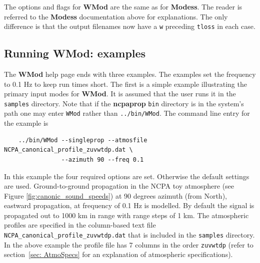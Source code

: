 The options and flags for {\bf WMod} are the same as for {\bf Modess}. The reader is referred to the {\bf Modess} documentation above for explanations. The only difference is that the output filenames now have a \verb+w+ preceding \verb+tloss+ in each case. 


\subsection{Running WMod: examples}
\label{sec: wmod examples}

The \textbf{WMod} help page ends with three examples. The examples set the frequency to 0.1 Hz to keep run times short. The first is a simple example illustrating the primary input modes for \textbf{WMod}. It is assumed that the user runs it in the \verb+samples+ directory. Note that if the \textbf{ncpaprop} \verb+bin+ directory is in the system's path one may enter \verb+WMod+ rather than \verb+../bin/WMod+. The command line entry for the example is 
\begin{verbatim} 
    ../bin/WMod --singleprop --atmosfile NCPA_canonical_profile_zuvwtdp.dat \ 
                --azimuth 90 --freq 0.1
\end{verbatim}
In this example the four required options are set. Otherwise the default settings are used. Ground-to-ground propagation in the NCPA toy atmosphere (see Figure \ref{fig:canonic_sound_speeds}) at 90 degrees azimuth (from North), eastward propagation, at frequency of 0.1 Hz is modelled. By default the signal is propagated out to 1000 km in range with range steps of 1 km. The atmospheric profiles are specified in the column-based text file \verb"NCPA_canonical_profile_zuvwtdp.dat" that is included in the \verb+samples+ directory. In the above example the profile file has 7 columns in the order \verb"zuvwtdp" (refer to section~\ref{sec: AtmoSpecs}  for an explanation of atmospheric specifications).

